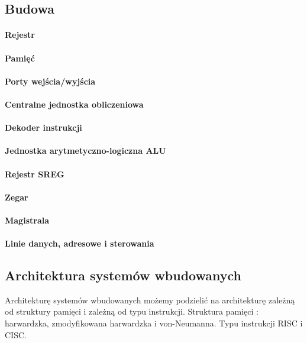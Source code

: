 \documentclass[12p]{article}
\begin{document}
\subsection{Budowa }
\paragraph{Rejestr} %
\paragraph{Pamięć} %
\paragraph{Porty wejścia/wyjścia}
\paragraph{Centralne jednostka obliczeniowa}
\paragraph{Dekoder instrukcji}
\paragraph{Jednostka arytmetyczno-logiczna ALU}
\paragraph{Rejestr SREG}
\paragraph{Zegar}
\paragraph{Magistrala}
\paragraph{Linie danych, adresowe i sterowania}

\subsection{Architektura systemów wbudowanych}
\quad Architekturę systemów wbudowanych możemy podzielić na architekturę zależną od struktury pamięci i zależną od typu instrukcji. Struktura pamięci : harwardzka, zmodyfikowana harwardzka i von-Neumanna. Typu instrukcji RISC i CISC.
\end{document}
